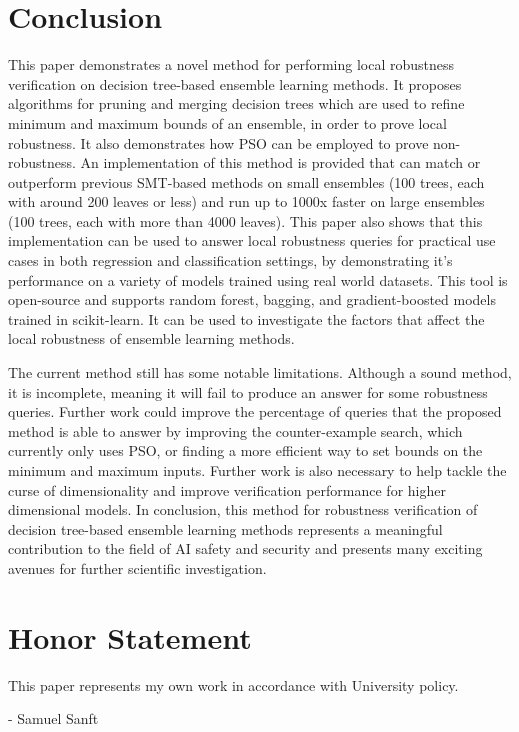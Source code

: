 \documentclass[pageno]{jpaper}
\begin{document}
\begin{doublespacing}
\section{Conclusion}
This paper demonstrates a novel method for performing local robustness verification on decision tree-based ensemble learning methods. It proposes algorithms for pruning and merging decision trees which are used to refine minimum and maximum bounds of an ensemble, in order to prove local robustness.  It also demonstrates how PSO can be employed to prove non-robustness. An implementation of this method is provided that can match or outperform previous SMT-based methods on small ensembles (100 trees, each with around 200 leaves or less) and run up to 1000x faster on large ensembles (100 trees, each with more than 4000 leaves). This paper also shows that this implementation can be used to answer local robustness queries for practical use cases in both regression and classification settings, by demonstrating it's performance on a variety of models trained using real world datasets. This tool is open-source \cite{github} and supports random forest, bagging, and gradient-boosted models trained in scikit-learn. It can be used to investigate the factors that affect the local robustness of ensemble learning methods.

The current method still has some notable limitations. Although a sound method, it is incomplete, meaning it will fail to produce an answer for some robustness queries. Further work could improve the percentage of queries that the proposed method is able to answer by improving the counter-example search, which currently only uses PSO, or finding a more efficient way to set bounds on the minimum and maximum inputs. Further work is also necessary to help tackle the curse of dimensionality and improve verification performance for higher dimensional models. In conclusion, this method for robustness verification of decision tree-based ensemble learning methods represents a meaningful contribution to the field of AI safety and security and presents many exciting avenues for further scientific investigation.

\section{Honor Statement}
This paper represents my own work in accordance with University policy.

\begin{flushright}
- Samuel Sanft
\end{flushright}

\end{doublespacing}



\end{document}
